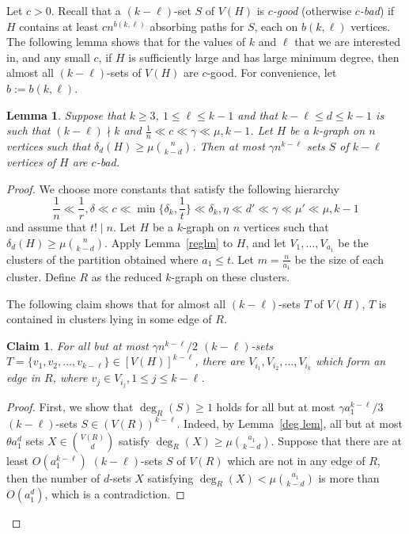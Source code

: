 \documentclass[11pt, reqno]{amsart}    	%
\newtheorem{claim}[thm]{Claim}
\newtheorem{lemma}[thm]{Lemma}
\theoremstyle{definition}
\numberwithin{equation}{section}
\begin{document}
\begin{appendix}
		Let $c>0$. Recall that a $( k-\ell) $-set $S$ of $V(H)$ is \emph{$c$-good} (otherwise \emph{$c$-bad}) if $H$ contains at least $cn^{b(k,\ell)}$ absorbing paths for $S$, each on  $b(k,\ell)$ vertices. The following lemma shows that for the values of $k$ and $\ell$ that we are interested in, and any small $c$, if $H$ is sufficiently large and has large minimum degree, then almost all $( k-\ell) $-sets of $ V(H) $ are $c$-good. For convenience, let $b:=b(k,\ell)$.
		
		\begin{lemma} \label{lem cbad}
			Suppose that $k\ge3$, $1\leq \ell \leq k-1$ and that $k-\ell\leq d \leq k-1$ is such that $(k-\ell)\nmid k$ and $\frac{1}{n} \ll c \ll \gamma  \ll \mu,k-1$. Let $H$ be a $k$-graph on $n$ vertices such that  $\delta_d(H)\ge \mu \binom{n}{k-d}$. Then at most $\gamma n^{k-\ell}$ sets $S$ of $k-\ell$ vertices of $H$ are $c$-bad.	
		\end{lemma}
		\begin{proof} We choose more constants that satisfy the following hierarchy
			\[\frac{1}{n} \ll \frac{1}{r},\delta \ll c \ll \min \{\delta_{k},\frac{1}{t}\} \ll \delta_{k},\eta \ll d' \ll \gamma\ll \mu'\ll \mu,k-1\]
			and assume that $t!\mid n$. Let $H$ be a $k$-graph on $n$ vertices such that  $\delta_d(H)\ge \mu \binom{n}{k-d}$. Apply Lemma~\ref{reglm} to $H$, and let $V_{1},\dots,V_{a_{1}}$ be the clusters of the partition obtained where $ a_1\le t $. Let $m = \frac{n}{a_{1}}$ be the size of each cluster. Define $R$ as the reduced $ k$-graph on these clusters.
			
			The following claim shows that for almost all $(k-\ell)$-sets $ T $  of $V(H)$, $ T $ is contained in clusters lying  in some  edge of $R$.
			\begin{claim} \label{claim2}
				For all but at most $\gamma n^{k-\ell}/2$  $(k-\ell)$-sets $T=\{v_{1},v_{2},\dots,v_{k-\ell} \} \in [V(H)]^{k-\ell}$, there are $V_{i_{1}},V_{i_{2}},\dots,V_{i_{k}}$ which form an edge in $R$, where $v_{j}\in V_{i_{j}}, 1\le j \le k-\ell$.
			\end{claim}
			\begin{proof}
				First, we show that $\deg_{R}(S)\ge 1 $ holds for all but at most $\gamma a_{1}^{k-\ell}/3$  $(k-\ell)$-sets 
				$S\in (V(R))^{k-\ell}$. Indeed, by Lemma~\ref{deg lem}, all but at most $\theta a_{1}^{d}$ sets $X\in \binom{V(R)}{d}$ satisfy $\deg_{R}(X)\ge \mu \binom{a_{1}}{k-d} $. Suppose that there are at least $O(a_{1}^{k-\ell})$ $(k-\ell)$-sets $S$ of $V(R)$ which are not in any edge of $R$, then the number of $d$-sets $X$ satisfying $\deg_{R}(X)< \mu  \binom{a_{1}}{k-d}$ is more than $O(a_{1}^{d}) $, which is a contradiction.
				

\end{proof}
\end{proof}
\end{appendix}
\end{document}
